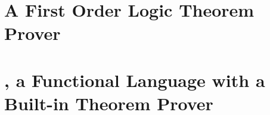 \section{A First Order Logic Theorem Prover}

\section{\Funl{}, a Functional Language with a Built-in Theorem Prover}


